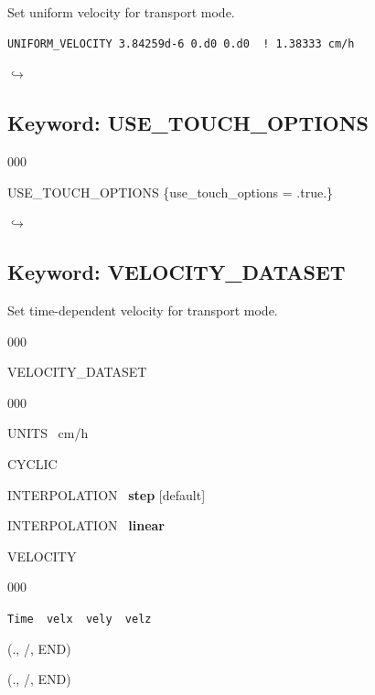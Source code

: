 \documentclass[12pt]{article}
\newcommand\return{{\hfill$\hookrightarrow$}}
\begin{document}
 Set uniform velocity for transport mode.

\begin{verbatim}
UNIFORM_VELOCITY 3.84259d-6 0.d0 0.d0  ! 1.38333 cm/h
\end{verbatim}

\hyperlink{target_key}{\return}


\newpage
\protect\hypertarget{target_touch}{}

\subsection{Keyword: USE\_TOUCH\_OPTIONS}


\begin{deflist}{000}
\item[USE\_TOUCH\_OPTIONS] \{use\_touch\_options = .true.\}
\end{deflist}



\hyperlink{target_key}{\return}


\newpage
\protect\hypertarget{target_veldata}{}

\subsection{Keyword: VELOCITY\_DATASET}

 Set time-dependent velocity for transport mode.

\begin{deflist}{000}
\item[VELOCITY\_DATASET] ~
\begin{deflist}{000}
\item[UNITS] \ cm/h
\item[CYCLIC]
\item[INTERPOLATION] \ {\bf step} [default]
\item[INTERPOLATION] \ {\bf linear}
\item[VELOCITY] ~
\begin{deflist}{000}
\item[{\tt Time \ velx \ vely \ velz}]
\end{deflist}
\item[(., /, END)]
\end{deflist}
\item[(., /, END)]
\end{deflist}
\end{document}
